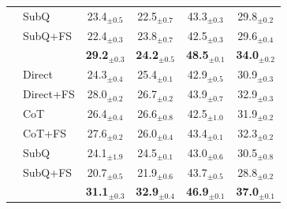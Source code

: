 \begin{table}[t]
\begin{tabular}{l l cccc}
& SubQ
& 23.4$_{\pm 0.5}$
& 22.5$_{\pm 0.7}$
& 43.3$_{\pm 0.3}$
& 29.8$_{\pm 0.2}$ \\

& SubQ+FS
& 22.4$_{\pm 0.3}$
& 23.8$_{\pm 0.7}$
& 42.5$_{\pm 0.3}$
& 29.6$_{\pm 0.4}$ \\

& \textbf{\OURS{}}
& \textbf{29.2$_{\pm 0.3}$}
& \textbf{24.2$_{\pm 0.5}$}
& \textbf{48.5$_{\pm 0.1}$}
& \textbf{34.0$_{\pm 0.2}$} \\
\midrule

& Direct
& 24.3$_{\pm 0.4}$
& 25.4$_{\pm 0.1}$
& 42.9$_{\pm 0.5}$
& 30.9$_{\pm 0.3}$ \\

& Direct+FS
& 28.0$_{\pm 0.2}$
& 26.7$_{\pm 0.2}$
& 43.9$_{\pm 0.7}$
& 32.9$_{\pm 0.3}$ \\

& CoT
& 26.4$_{\pm 0.4}$
& 26.6$_{\pm 0.8}$
& 42.5$_{\pm 1.0}$
& 31.9$_{\pm 0.2}$ \\

& CoT+FS
& 27.6$_{\pm 0.2}$
& 26.0$_{\pm 0.4}$
& 43.4$_{\pm 0.1}$
& 32.3$_{\pm 0.2}$ \\

& SubQ
& 24.1$_{\pm 1.9}$
& 24.5$_{\pm 0.1}$
& 43.0$_{\pm 0.6}$
& 30.5$_{\pm 0.8}$ \\

& SubQ+FS
& 20.7$_{\pm 0.5}$
& 21.9$_{\pm 0.6}$
& 43.7$_{\pm 0.5}$
& 28.8$_{\pm 0.2}$ \\

& \textbf{\OURS{}}
& \textbf{31.1$_{\pm 0.3}$}
& \textbf{32.9$_{\pm 0.4}$}
& \textbf{46.9$_{\pm 0.1}$}
& \textbf{37.0$_{\pm 0.1}$} \\
\bottomrule
\end{tabular}
\end{table}
